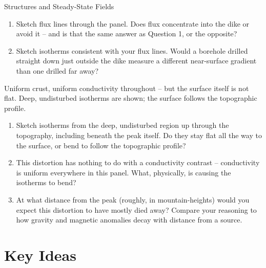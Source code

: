 \begin{activity}{Structures and Steady-State Fields}
\begin{questions}
\begin{enumerate}[label=(\alph*)]
  \item Sketch flux lines through the panel. Does flux concentrate into the dike or avoid it -- and is that the same answer as Question 1, or the opposite?
  \answerbox[2cm]

  \item Sketch isotherms consistent with your flux lines. Would a borehole drilled straight down just outside the dike measure a different near-surface gradient than one drilled far away?
  \answerbox[2.5cm]
\end{enumerate}


Uniform crust, uniform conductivity throughout -- but the surface itself is not flat. Deep, undisturbed isotherms are shown; the surface follows the topographic profile.

\begin{center}
\end{center}

\begin{enumerate}[label=(\alph*)]
  \item Sketch isotherms from the deep, undisturbed region up through the topography, including beneath the peak itself. Do they stay flat all the way to the surface, or bend to follow the topographic profile?
  \answerbox[2.5cm]

  \item This distortion has nothing to do with a conductivity contrast -- conductivity is uniform everywhere in this panel. What, physically, is causing the isotherms to bend?
  \answerbox[2cm]

  \item At what distance from the peak (roughly, in mountain-heights) would you expect this distortion to have mostly died away? Compare your reasoning to how gravity and magnetic anomalies decay with distance from a source.
  \answerbox[2cm]
\end{enumerate}

\end{questions}

\section*{Key Ideas}


\end{activity}
